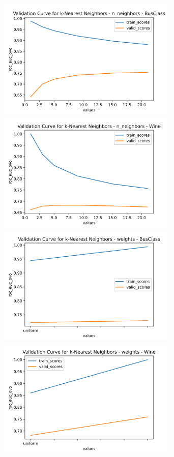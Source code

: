 \documentclass[
	letterpaper, %
]{jdf}
\begin{document}
\includegraphics[width=3.4in]{Figures/BusClass-0920/KNN/val_curve_0.png}
\includegraphics[width=3.4in]{Figures/Wine-0921/KNN/val_curve_0.png}
\includegraphics[width=3.4in]{Figures/BusClass-0920/KNN/val_curve_1.png}
\includegraphics[width=3.4in]{Figures/Wine-0921/KNN/val_curve_1.png}
\end{document}
